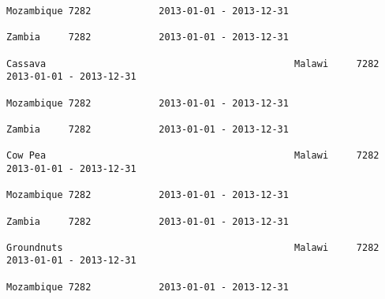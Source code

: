 \documentclass[11pt]{article}
\begin{document}
\begin{Verbatim}[commandchars=\\\{\}]
                                                                                                                                                                                                                 Mozambique 7282            2013-01-01 - 2013-12-31   
                                                                                                                                                                                                                 Zambia     7282            2013-01-01 - 2013-12-31   
                                                                                                                                                              Cassava                                            Malawi     7282            2013-01-01 - 2013-12-31   
                                                                                                                                                                                                                 Mozambique 7282            2013-01-01 - 2013-12-31   
                                                                                                                                                                                                                 Zambia     7282            2013-01-01 - 2013-12-31   
                                                                                                                                                              Cow Pea                                            Malawi     7282            2013-01-01 - 2013-12-31   
                                                                                                                                                                                                                 Mozambique 7282            2013-01-01 - 2013-12-31   
                                                                                                                                                                                                                 Zambia     7282            2013-01-01 - 2013-12-31   
                                                                                                                                                              Groundnuts                                         Malawi     7282            2013-01-01 - 2013-12-31   
                                                                                                                                                                                                                 Mozambique 7282            2013-01-01 - 2013-12-31   

\end{Verbatim}
\end{document}
